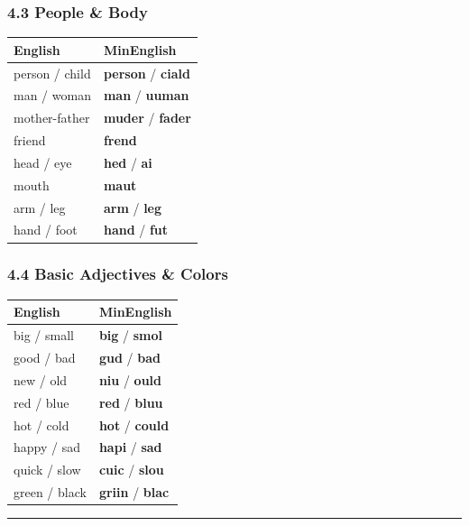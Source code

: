 \subsubsection{4.3 People \& Body}\label{people-body}

{\def\LTcaptype{} %
\begin{longtable}[]{@{}ll@{}}
\toprule\noalign{}
English & MinEnglish \\
\midrule\noalign{}
\endhead
\bottomrule\noalign{}
\endlastfoot
person / child & \textbf{person} / \textbf{ciald} \\
man / woman & \textbf{man} / \textbf{uuman} \\
mother-father & \textbf{muder} / \textbf{fader} \\
friend & \textbf{frend} \\
head / eye & \textbf{hed} / \textbf{ai} \\
mouth & \textbf{maut} \\
arm / leg & \textbf{arm} / \textbf{leg} \\
hand / foot & \textbf{hand} / \textbf{fut} \\
\end{longtable}
}

\subsubsection{4.4 Basic Adjectives \&
Colors}\label{basic-adjectives-colors}

{\def\LTcaptype{} %
\begin{longtable}[]{@{}ll@{}}
\toprule\noalign{}
English & MinEnglish \\
\midrule\noalign{}
\endhead
\bottomrule\noalign{}
\endlastfoot
big / small & \textbf{big} / \textbf{smol} \\
good / bad & \textbf{gud} / \textbf{bad} \\
new / old & \textbf{niu} / \textbf{ould} \\
red / blue & \textbf{red} / \textbf{bluu} \\
hot / cold & \textbf{hot} / \textbf{could} \\
happy / sad & \textbf{hapi} / \textbf{sad} \\
quick / slow & \textbf{cuic} / \textbf{slou} \\
green / black & \textbf{griin} / \textbf{blac} \\
\end{longtable}
}

\begin{center}\rule{0.5\linewidth}{0.5pt}\end{center}

